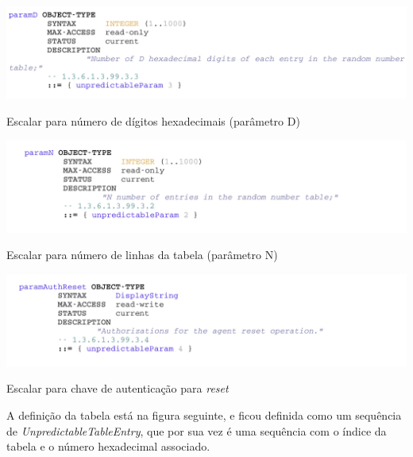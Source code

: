 \begin{center}
 	
 	\includegraphics[width=\textwidth,height=\textheight,keepaspectratio]{resources/images/faseA/mib/scalars/paramD.png}
 	\captionsetup{type=figure, width=0.8\linewidth}
	\caption{Escalar para número de dígitos hexadecimais (parâmetro D)}
\label{fig:fasea:} 
\end{center}

\begin{center}
 	
 	\includegraphics[width=\textwidth,height=\textheight,keepaspectratio]{resources/images/faseA/mib/scalars/paramN.png}
 	\captionsetup{type=figure, width=0.8\linewidth}
	\caption{Escalar para número de linhas da tabela (parâmetro N)}
\label{fig:fasea:} 
\end{center}

\begin{center}
 	
 	\includegraphics[width=\textwidth,height=\textheight,keepaspectratio]{resources/images/faseA/mib/scalars/paramAuthReset.png}
 	\captionsetup{type=figure, width=0.8\linewidth}
	\caption{Escalar para chave de autenticação para \emph{reset} }
\label{fig:fasea:} 
\end{center}

\newpage
A definição da tabela está na figura seguinte, e ficou definida como um
sequência de \emph{UnpredictableTableEntry}, que por sua vez é uma sequência
com o índice da tabela e o número hexadecimal associado. 

